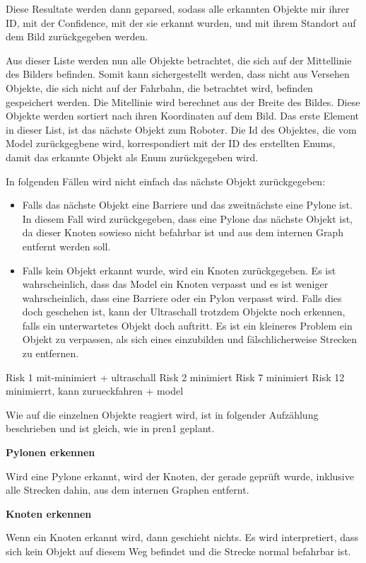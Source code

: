 Diese Resultate werden dann geparsed, sodass alle erkannten Objekte mir ihrer ID, mit der Confidence, mit der sie erkannt wurden, und mit ihrem Standort auf dem Bild zurückgegeben werden.

Aus dieser Liste werden nun alle Objekte betrachtet, die sich auf der Mittellinie des Bilders befinden. Somit kann sichergestellt werden, dass nicht aus Versehen Objekte, die sich nicht auf der Fahrbahn, die betrachtet wird, befinden gespeichert werden. Die Mitellinie wird berechnet aus der Breite des Bildes. Diese Objekte werden sortiert nach ihren Koordinaten auf dem Bild. Das erste Element in dieser List, ist das nächste Objekt zum Roboter. Die Id des Objektes, die vom Model zurückgegbene wird, korrespondiert mit der ID des erstellten Enums, damit das erkannte Objekt als Enum zurückgegeben wird.

In folgenden Fällen wird nicht einfach das nächste Objekt zurückgegeben:

\begin{itemize}
    \item Falls das nächste Objekt eine Barriere und das zweitnächste eine Pylone ist. In diesem Fall wird zurückgegeben, dass eine Pylone das nächste Objekt ist, da dieser Knoten sowieso nicht befahrbar ist und aus dem internen Graph entfernt werden soll.
    \item Falls kein Objekt erkannt wurde, wird ein Knoten zurückgegeben. Es ist wahrscheinlich, dass das Model ein Knoten verpasst und es ist weniger wahrscheinlich, dass eine Barriere oder ein Pylon verpasst wird. Falls dies doch geschehen ist, kann der Ultraschall trotzdem Objekte noch erkennen, falls ein unterwartetes Objekt doch auftritt. Es ist ein kleineres Problem ein Objekt zu verpassen, als sich eines einzubilden und fälschlicherweise Strecken zu entfernen.
\end{itemize}

Risk 1 mit-minimiert + ultraschall
Risk 2 minimiert
Risk 7 minimiert
Risk 12 minimierrt, kann zurueckfahren + model

Wie auf die einzelnen Objekte reagiert wird, ist in folgender Aufzählung beschrieben und ist gleich, wie in \acrshort{pren1} geplant.

\textbf{Pylonen erkennen}

Wird eine Pylone erkannt, wird der Knoten, der gerade geprüft wurde, inklusive alle Strecken dahin, aus dem internen Graphen entfernt.

\textbf{Knoten erkennen}

Wenn ein Knoten erkannt wird, dann geschieht nichts. Es wird interpretiert, dass sich kein Objekt auf diesem Weg befindet und die Strecke normal befahrbar ist.

